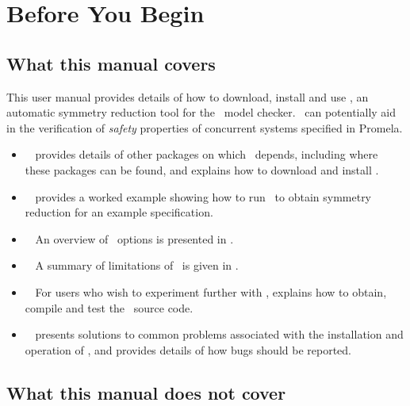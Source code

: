 \chapter*{Before You Begin}

\section*{\secfont What this manual covers}

This user manual provides details of how to download, install and
use \topspin, an automatic symmetry reduction tool for the \spin\
model checker.  \topspin\ can potentially aid in the verification of
\emph{safety} properties of concurrent systems specified in Promela.

\begin{itemize}
\item {\bf \downloadingandinstalling\ } 
provides details of other packages on which \topspin\ depends,
including where these packages can be found, and explains how to
download and install \topspin.

\item {\bf \workedexample\ }  provides a worked example showing how to run
\topspin\ to obtain symmetry reduction for an example specification.

\item {\bf \overviewofoptions\ } An overview of
\topspin\ options is presented in .

\item {\bf \limitations\ } A summary of limitations of \topspin\ is given in .

\item {\bf \buildingfromsource\ } For users who wish to experiment further with \topspin,
\chapref{compilingfromsource} explains how to obtain, compile and
test the \topspin\ source code.

\item {\bf \troubleshooting\ }  presents solutions to common problems
associated with the installation and operation of \topspin, and
provides details of how bugs should be reported.

\end{itemize}

\section*{What this manual does not cover}

